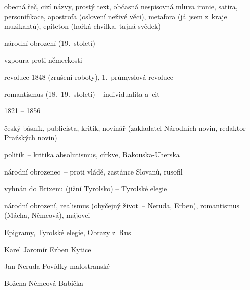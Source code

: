 {\newpart

obecná řeč, cizí názvy, prostý text, občasná nespisovná mluva
ironie, satira, personifikace, apostrofa (oslovení neživé věci), metafora (já
jsem z~kraje muzikantů), epiteton (hořká chvilka, tajná svědek)

\begin{compactitem}
	\item národní obrození (19.~století)
	\item vzpoura proti německosti
	\item revoluce 1848 (zrušení roboty), 1.~průmyslová revoluce
	\item romantismus (18.--19.~století) -- individualita a~cit
\end{compactitem}

\parag{\getauthor}
\begin{compactitem}
\item 1821 -- 1856
\item český básník, publicista, kritik, novinář (zakladatel Národních novin,
	redaktor Pražských novin)
\item politik~-- kritika absolutismus, církve, Rakouska-Uherska
\item národní obrozenec~-- proti vládě, zastánce Slovanů, rusofil
\item vyhnán do Brixenu (jižní Tyrolsko) -- Tyrolské elegie
\item národní obrození, realismus (obyčejný život~-- Neruda, Erben),
	romantismus (Mácha, Němcová), májovci
\item Epigramy, Tyrolské elegie, Obrazy z~Rus
\end{compactitem}

\begin{compactdesc}
	\item[Karel Jaromír Erben] Kytice
	\item[Jan Neruda] Povídky malostranské
	\item[Božena Němcová] Babička
\end{compactdesc}
}
